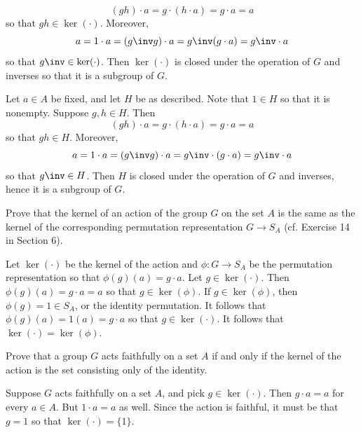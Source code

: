 \begin{problems}
\begin{solalph}
        \[(gh) \cdot a = g \cdot (h \cdot a) = g \cdot a = a\]
        so that $gh \in \ker(\cdot)$. Moreover,
        \[a = 1 \cdot a = (g \inv g) \cdot a = g\inv (g \cdot a) = g\inv \cdot a\]
        so that $g\inv \in \ker(\cdot)$. Then $\ker(\cdot)$ is closed under the operation of $G$ and inverses so that it is a subgroup of $G$.
        \item Let $a \in A$ be fixed, and let $H$ be as described. Note that $1 \in H$ so that it is nonempty. Suppose $g, h \in H$. Then
        \[(gh) \cdot a = g \cdot (h \cdot a) = g \cdot a = a\]
        so that $gh \in H$. Moreover,
        \[a = 1 \cdot a = (g\inv g) \cdot a = g\inv \cdot (g \cdot a) = g\inv \cdot a\]
        so that $g\inv \in H$. Then $H$ is closed under the operation of $G$ and inverses, hence it is a subgroup of $G$.
    \end{solalph}
    \item Prove that the kernel of an action of the group $G$ on the set $A$ is the same as the kernel of the corresponding permutation representation $G\to S_A$ (cf. Exercise 14 in Section 6).
    \begin{sol}
        Let $\ker(\cdot)$ be the kernel of the action and $\phi : G \to S_A$ be the permutation representation so that $\phi(g)(a) = g \cdot a$. Let $g \in \ker(\cdot)$. Then $\phi(g)(a) = g \cdot a = a$ so that $g \in \ker(\phi)$. If $g \in \ker(\phi)$, then $\phi(g) = 1 \in S_A$, or the identity permutation. It follows that $\phi(g)(a) = 1(a) = g \cdot a$ so that $g \in \ker(\cdot)$. It follows that $\ker(\cdot) = \ker(\phi)$.
    \end{sol}
    \item Prove that a group $G$ acts faithfully on a set $A$ if and only if the kernel of the action is the set consisting only of the identity.
    \begin{sol}
        Suppose $G$ acts faithfully on a set $A$, and pick $g \in \ker(\cdot)$. Then $g \cdot a = a$ for every $a \in A$. But $1 \cdot a = a$ as well. Since the action is faithful, it must be that $g = 1$ so that $\ker(\cdot) = \{1\}$.
        

\end{sol}
\end{problems}
